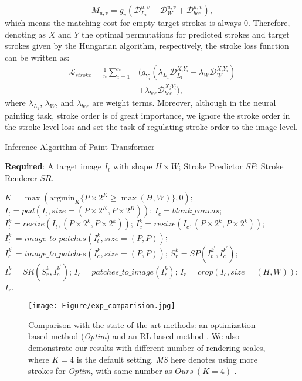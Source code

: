 \documentclass[10pt,twocolumn,letterpaper]{article}
\begin{document}
\begin{equation}
    M_{u, v}=g_v(\mathcal{D}^{u,v}_{L_1}+\mathcal{D}^{u,v}_W+\mathcal{D}^{u,v}_{bce}),
\end{equation}
which means the matching cost for empty target strokes is always $0$.
Therefore, denoting as $X$ and $Y$ the optimal permutations for predicted strokes and target strokes given by the Hungarian algorithm, respectively, the stroke loss function can be written as:
\begin{equation}
\begin{aligned}
    \mathcal{L}_{stroke}=\frac{1}{n}\sum_{i=1}^n&(g_{Y_i}(\lambda_{L_1}\mathcal{D}^{X_iY_i}_{L_1}+\lambda_{W}\mathcal{D}^{X_iY_i}_{W})\\&+\lambda_{bce}\mathcal{D}^{X_iY_i}_{bce}),
\end{aligned}
\end{equation}
where $\lambda_{L_1}$, $\lambda_W$, and $\lambda_{bce}$ are weight terms.
Moreover, although in the neural painting task, stroke order is of great importance, we ignore the stroke order in the stroke level loss and set the task of regulating stroke order to the image level.



\begin{algorithm}[!t]
	\caption{Inference Algorithm of Paint Transformer}
    \textbf{Required}: A target image $I_t$ with shape $H\times W$; Stroke Predictor $SP$; Stroke Renderer $SR$.
    \begin{algorithmic}[1]
        \State $K=\max(\mathrm{argmin}_K\{P\times 2^K\geq\max(H,W)\},0)$;
        \State $I_t=pad(I_t,size=(P\times 2^K,P\times 2^K))$;
        \State $I_c=blank\_canvas$;
            \State $I_t^k=resize(I_t,(P\times 2^k,P\times 2^k))$;
            \State $I_c^k=resize(I_c,(P\times 2^k,P\times 2^k))$;
            \State $I_t^{k^{'}}=image\_to\_patches(I_t^k,size=(P,P))$;
            \State $I_c^{k^{'}}=image\_to\_patches(I_c^k,size=(P,P))$;
            \State $S_r^{k}=SP(I_t^{k^{'}},I_c^{k^{'}})$;
            \State $I_r^{k}=SR(S_r^{k}, I_c^{k^{'}})$;
            \State $I_c=patches\_to\_image(I_r^{k})$;
        \EndFor
        \State $I_r=crop(I_c,size=(H,W))$;\\
        \Return $I_r$.
	\end{algorithmic}
	\label{inference}
	
\end{algorithm}

\begin{figure*}[t]
\begin{center}
\texttt{[image: Figure/exp\_comparision.jpg]}
\end{center}
   \caption{Comparison with the state-of-the-art methods: an optimization-based method (\emph{Optim}) \cite{zou2020stylized} and an RL-based method \cite{huang2019learning}. We also demonstrate our results with different number of rendering scales, where $K=4$ is the default setting. \emph{MS} here denotes using more strokes for \emph{Optim}, with same number as \emph{$Ours~(K=4)$} .}
\label{fig:comparison_optim}
\end{figure*}
\end{document}
